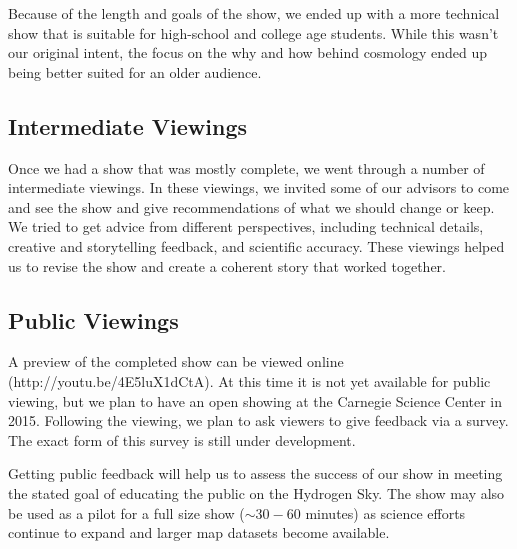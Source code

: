 Because of the length and goals of the show, we ended up with a more technical show that is suitable for high-school and college age students. While this wasn't our original intent, the focus on the why and how behind \cm cosmology ended up being better suited for an older audience. 


\subsection{Intermediate Viewings}

Once we had a show that was mostly complete, we went through a number of intermediate viewings. In these viewings, we invited some of our advisors to come and see the show and give recommendations of what we should change or keep. We tried to get advice from different perspectives, including technical details, creative and storytelling feedback, and scientific accuracy. These viewings helped us to revise the show and create a coherent story that worked together. 


\subsection{Public Viewings}

A preview of the completed show can be viewed online (http://youtu.be/4E5luX1dCtA). At this time it is not yet available for public viewing, but we plan to have an open showing at the Carnegie Science Center in 2015. Following the viewing, we plan to ask viewers to give feedback via a survey. The exact form of this survey is still under development. 

Getting public feedback will help us to assess the success of our show in meeting the stated goal of educating the public on the Hydrogen Sky. The show may also be used as a pilot for a full size show ($\sim 30-60$ minutes) as \cm science efforts continue to expand and larger \cm map datasets become available. 
